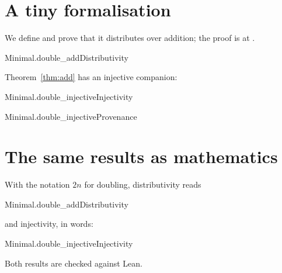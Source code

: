 \documentclass{article}
\begin{document}
\section{A tiny formalisation}

We define  and prove that it distributes over
addition; the proof is at .

\begin{leantheorem}[label=thm:add]{Minimal.double_add}{Distributivity}
\end{leantheorem}

Theorem~\ref{thm:add} has an injective companion:
\begin{leanblock}[view=lean]{Minimal.double_injective}{Injectivity}
\end{leanblock}

\begin{leanblock}[view=meta]{Minimal.double_injective}{Provenance}
\end{leanblock}

\section{The same results as mathematics}

With the notation $2n$ for doubling, distributivity reads
\begin{leanblock}[view=math]{Minimal.double_add}{Distributivity}
\end{leanblock}
and injectivity, in words:
\begin{leanblock}[view=prose]{Minimal.double_injective}{Injectivity}
\end{leanblock}

Both results are checked 
against Lean.
\end{document}
